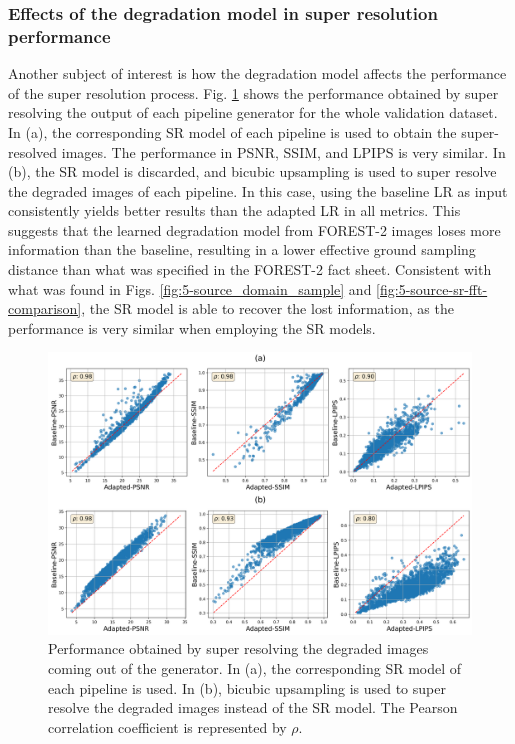         \subsubsection{Effects of the degradation model in super resolution performance}

        Another subject of interest is how the degradation model affects the performance of the super resolution process.
        Fig. \ref{fig:5-source-domain-comparison} shows the performance obtained by super resolving the output of each pipeline generator for the whole validation dataset.
        In (a), the corresponding SR model of each pipeline is used to obtain the super-resolved images. 
        The performance in PSNR, SSIM, and LPIPS is very similar.
        In (b), the SR model is discarded, and bicubic upsampling is used to super resolve the degraded images of each pipeline. 
        In this case, using the baseline LR as input consistently yields better results than the adapted LR  in all metrics.
        This suggests that the learned degradation model from FOREST-2 images loses more information than the baseline, resulting in a lower effective ground sampling distance than what was specified in the FOREST-2 fact sheet.
        Consistent with what was found in Figs. \ref{fig:5-source_domain_sample} and \ref{fig:5-source-sr-fft-comparison}, the SR model is able to recover the lost information, as the performance is very similar when employing the SR models. 
        
        \begin{figure}[H]
            \centering
            \includegraphics[width=\textwidth]{Includes/5-source-domain-comparison.png}
            \caption{Performance obtained by super resolving the degraded images coming out of the generator. 
                     In (a), the corresponding SR model of each pipeline is used. 
                     In (b), bicubic upsampling is used to super resolve the degraded images instead of the SR model. The Pearson correlation coefficient is represented by $\rho$. }
            \label{fig:5-source-domain-comparison}
        \end{figure}

